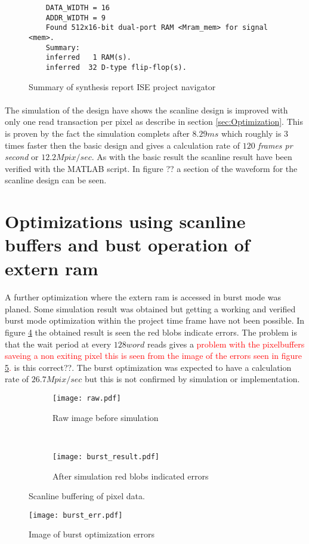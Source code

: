 \begin{figure}[H]
\centering
\begin{BVerbatim}
    DATA_WIDTH = 16
    ADDR_WIDTH = 9
    Found 512x16-bit dual-port RAM <Mram_mem> for signal <mem>.
    Summary:
	inferred   1 RAM(s).
	inferred  32 D-type flip-flop(s).
\end{BVerbatim}
\caption{Summary of synthesis report ISE project navigator}
\label{fig:sum_synthesis_report_ram}
\end{figure}

\paragraph*{}
The simulation of the design have shows the scanline design is improved with only one read transaction per pixel as describe in section \ref{sec:Optimization}. This is proven by the fact the simulation complets after $8.29ms$ which roughly is 3 times faster then the basic design and gives a calculation rate of $120$ \textit{frames pr second} or $12.2Mpix/sec$. As with the basic result the scanline result have been verified with the MATLAB script. In figure ?? a section of the waveform  for the scanline design can be seen.

\section{Optimizations using scanline buffers and bust operation of extern ram}
\paragraph*{}
A further optimization where the extern ram is accessed in burst mode was planed. Some simulation result was obtained but getting a working and verified burst mode optimization within the project time frame have not been possible. In figure \ref{fig:burst_picture} the obtained result is seen the red blobs indicate errors. The problem is that the wait period at every $128word$ reads gives a \textcolor{red}{problem with the pixelbuffers saveing a non exiting pixel this is seen from the image of the errors seen in figure \ref{fig:pic_burst_err}.} is this correct??. The burst optimization was expected to have a calculation rate of $26.7Mpix/sec$ but this is not confirmed by simulation or implementation.
     
\begin{figure}[H]
	\centering
	\begin{subfigure}[b]{0.5\textwidth}
		\texttt{[image: raw.pdf]}
		\caption{Raw image before simulation}
		\label{fig:raw_burst}
    \end{subfigure}%
        ~ %
    \begin{subfigure}[b]{0.5\textwidth}
    	\texttt{[image: burst\_result.pdf]}
    	\caption{After simulation red blobs indicated errors}
    	\label{fig:burst_picture_sobel}
	\end{subfigure}
	\caption{Scanline buffering of pixel data.}
    	\label{fig:burst_picture}
\end{figure}


\begin{figure}[H]
	\centering
	\texttt{[image: burst\_err.pdf]}
	\caption{Image of burst optimization errors}
	\label{fig:pic_burst_err}
\end{figure}
